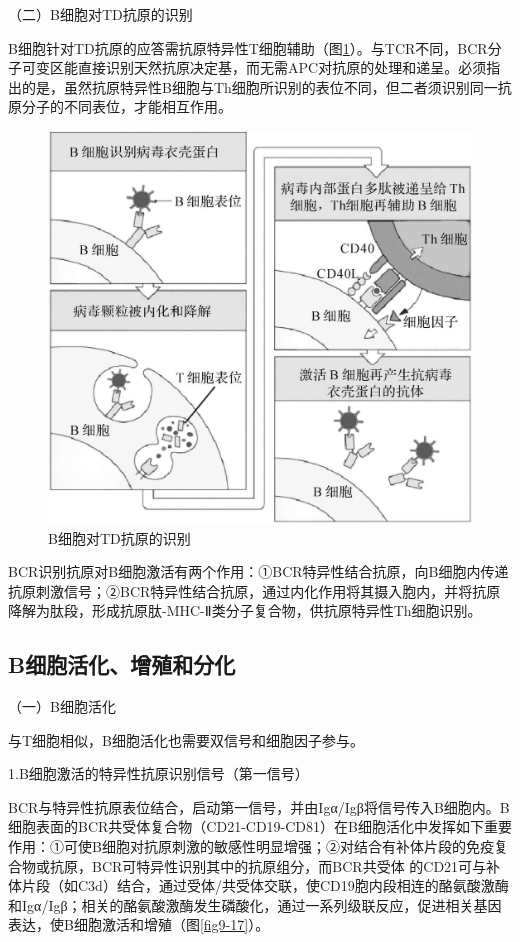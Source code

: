 （二）B细胞对TD抗原的识别

B细胞针对TD抗原的应答需抗原特异性T细胞辅助（图\ref{fig9-16}）。与TCR不同，BCR分子可变区能直接识别天然抗原决定基，而无需APC对抗原的处理和递呈。必须指出的是，虽然抗原特异性B细胞与Th细胞所识别的表位不同，但二者须识别同一抗原分子的不同表位，才能相互作用。

\begin{figure}[!htbp]
 \centering
 \includegraphics{./images/Image00142.jpg}
 \captionsetup{justification=centering}
 \caption{B细胞对TD抗原的识别}
 \label{fig9-16}
  \end{figure} 

BCR识别抗原对B细胞激活有两个作用：①BCR特异性结合抗原，向B细胞内传递抗原刺激信号；②BCR特异性结合抗原，通过内化作用将其摄入胞内，并将抗原降解为肽段，形成抗原肽-MHC-Ⅱ类分子复合物，供抗原特异性Th细胞识别。


\subsection{B细胞活化、增殖和分化}

（一）B细胞活化

与T细胞相似，B细胞活化也需要双信号和细胞因子参与。

1.B细胞激活的特异性抗原识别信号（第一信号）

BCR与特异性抗原表位结合，启动第一信号，并由Igα/Igβ将信号传入B细胞内。B细胞表面的BCR共受体复合物（CD21-CD19-CD81）在B细胞活化中发挥如下重要作用：①可使B细胞对抗原刺激的敏感性明显增强；②对结合有补体片段的免疫复合物或抗原，BCR可特异性识别其中的抗原组分，而BCR共受体
的CD21可与补体片段（如C3d）结合，通过受体/共受体交联，使CD19胞内段相连的酪氨酸激酶和Igα/Igβ；相关的酪氨酸激酶发生磷酸化，通过一系列级联反应，促进相关基因表达，使B细胞激活和增殖（图\ref{fig9-17}）。

